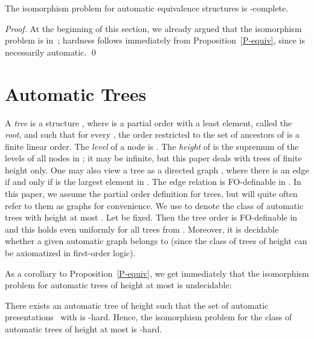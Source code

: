 \documentclass[envcountsame]{llncs}
\begin{document}
\begin{theorem}\label{thm:equiv}
  The isomorphism problem for automatic equivalence structures is
  -complete.
\end{theorem}

\begin{proof}
  At the beginning of this section, we already argued that the
  isomorphism problem is in~; hardness follows immediately
  from Proposition~\ref{P-equiv}, since  is necessarily automatic.
\qed
\end{proof}

\section{Automatic Trees}\label{sec:tree}

A {\em tree} is a structure , where  is a
partial order with a least element, called the {\em root}, and such
that for every , the order  restricted to the set
 of ancestors of  is a finite linear order.
The {\em level} of a node  is
. The {\em height} of
 is the supremum of the levels of all nodes in ; it may be
infinite, but this paper deals with trees of finite height only.
One may also view a tree as a directed graph , where there is
an edge  if and only if  is the largest element in .  The edge relation  is FO-definable in
. In this paper, we assume the partial order definition for
trees, but will quite often refer to them as graphs for
convenience.  We use  to denote the class of automatic trees with height at most
. Let  be fixed. Then the tree order  is FO-definable in
 and this holds even uniformly for all trees from . Moreover,
it is decidable whether a given automatic graph belongs to 
(since the class of trees of height  can be axiomatized in
first-order logic). 

As a corollary to Proposition~\ref{P-equiv}, we get immediately that the
isomorphism problem for automatic trees of height at most  is
undecidable:

\begin{corollary}\label{crl:tree2}
  There exists an automatic tree  of height  such that the set of
  automatic presentations~ with  is
  -hard. Hence, the isomorphism problem for the class 
  of automatic trees of height at most  is -hard.
\end{corollary}
\end{document}
